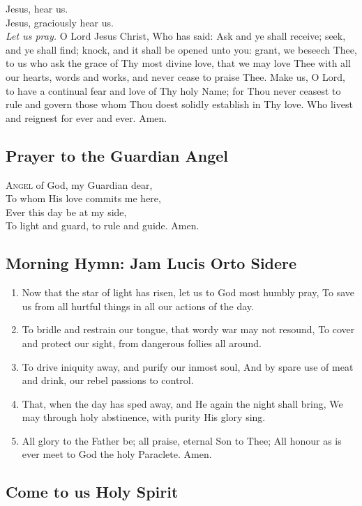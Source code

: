 \documentclass{article}
\begin{document}
\begin{multicols}{3}
Jesus, hear us.\\
Jesus, graciously hear us.\\
\textit{Let us pray.} O Lord Jesus Christ, Who has said: Ask and ye shall receive;
seek, and ye shall find; knock, and it shall be opened unto you: grant,
we beseech Thee, to us who ask the grace of Thy most divine love, that we may
love Thee with all our hearts, words and works, and never cease to praise Thee.
Make us, O Lord, to have a continual fear and love of Thy holy Name; for Thou
never ceasest to rule and govern those whom Thou doest solidly establish in Thy
love. Who livest and reignest for ever and ever. Amen.

\subsection*{Prayer to the Guardian Angel}

\textsc{Angel} of God, my Guardian dear,\\
To whom His love commits me here,\\
Ever this day be at my side,\\
To light and guard, to rule and guide.  Amen.

\subsection*{Morning Hymn: Jam Lucis Orto Sidere}

\begin{enumerate}
    \item Now that the star of light has risen, let us to God most humbly pray,
To save us from all hurtful things in all our actions of the day.
    \item To bridle and restrain our tongue, that wordy war may not resound,
To cover and protect our sight,  from dangerous follies all around.
    \item To drive iniquity away, and purify our inmost soul,
And by spare use of meat and drink, our rebel passions to control.
    \item That, when the day has sped away, and He again the night shall bring,
We may through holy abstinence, with purity His glory sing.
    \item All glory to the Father be; all praise, eternal Son to Thee;
All honour as is ever meet to God the holy Paraclete. Amen.
\end{enumerate}

\subsection*{Come to us Holy Spirit}


\end{multicols}
\end{document}
